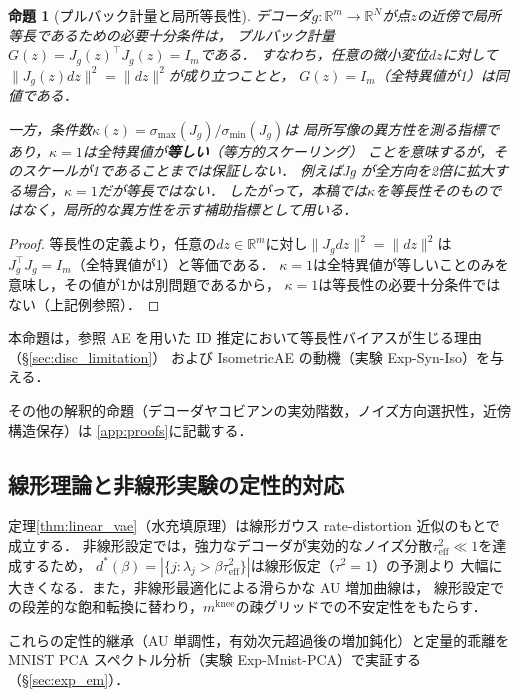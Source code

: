 \documentclass[11pt,a4paper]{jsarticle}
\newtheorem{proposition}{命題}
\newcommand{\Jg}{J_g}
\newcommand{\R}{\mathbb{R}}
\newcommand{\kap}{\kappa}
\newcommand{\mknee}{m^{\mathrm{knee}}}
\begin{document}
\begin{proposition}[プルバック計量と局所等長性]\label{thm:pullback}
デコーダ$g: \R^m \to \R^N$が点$z$の近傍で局所等長であるための必要十分条件は，
プルバック計量$G(z) = \Jg(z)^\top \Jg(z) = I_m$である．
すなわち，任意の微小変位$dz$に対して$\|\Jg(z)dz\|^2 = \|dz\|^2$が成り立つことと，
$G(z)=I_m$（全特異値が1）は同値である．

一方，条件数$\kap(z) = \sigma_{\max}(\Jg) / \sigma_{\min}(\Jg)$は
局所写像の異方性を測る指標であり，$\kap = 1$は全特異値が\textbf{等しい}（等方的スケーリング）
ことを意味するが，そのスケールが1であることまでは保証しない．
例えばJg が全方向を2倍に拡大する場合，$\kap=1$だが等長ではない．
したがって，本稿では$\kap$を等長性そのものではなく，局所的な異方性を示す補助指標として用いる．
\end{proposition}

\begin{proof}
等長性の定義より，任意の$dz \in \R^m$に対し$\|J_g dz\|^2 = \|dz\|^2$は
$J_g^\top J_g = I_m$（全特異値が1）と等価である．
$\kap = 1$は全特異値が等しいことのみを意味し，その値が1かは別問題であるから，
$\kap=1$は等長性の必要十分条件ではない（上記例参照）．
\end{proof}

本命題は，参照 AE を用いた ID 推定において等長性バイアスが生じる理由（§\ref{sec:disc_limitation}）
および IsometricAE の動機（実験 Exp-Syn-Iso）を与える．

その他の解釈的命題（デコーダヤコビアンの実効階数，ノイズ方向選択性，近傍構造保存）は
\ref{app:proofs}に記載する．

\subsection{線形理論と非線形実験の定性的対応}\label{sec:theory_bridge}

定理\ref{thm:linear_vae}（水充填原理）は線形ガウス rate-distortion 近似のもとで成立する．
非線形設定では，強力なデコーダが実効的なノイズ分散$\tau^2_\mathrm{eff} \ll 1$を達成するため，
$d^*(\beta) = |\{j : \lambda_j > \beta\tau^2_\mathrm{eff}\}|$は線形仮定（$\tau^2=1$）の予測より
大幅に大きくなる．また，非線形最適化による滑らかな AU 増加曲線は，
線形設定での段差的な飽和転換に替わり，$\mknee$の疎グリッドでの不安定性をもたらす．

これらの定性的継承（AU 単調性，有効次元超過後の増加鈍化）と定量的乖離を
MNIST PCA スペクトル分析（実験 Exp-Mnist-PCA）で実証する（§\ref{sec:exp_em}）．
\end{document}
